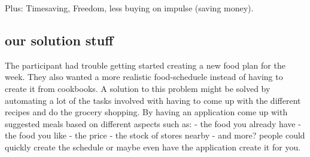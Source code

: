Plus: Timesaving, Freedom, less buying on impulse (saving money).


\subsection{our solution stuff }
The participant had trouble getting started creating a new food plan for the week. They also wanted a more realistic food-scheduele instead of having to create it from cookbooks.
A solution to this problem might be solved by automating a lot of the tasks involved with having to come up with the different recipes and do the grocery shopping.
By having an application come up with suggested meals based on different aspects such as:
- the food you already have
- the food you like
- the price
- the stock of stores nearby
- and more?
people could quickly create the schedule or maybe even have the application create it for you.

